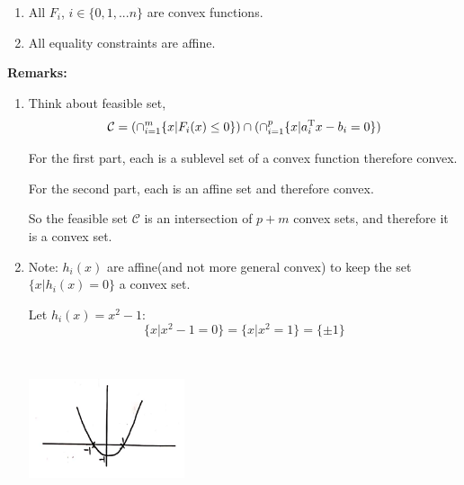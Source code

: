 \begin{enumerate}
	\item All $F_i$, $i\in \{0,1,...n \}$ are convex functions.
	\item All equality constraints are affine.
\end{enumerate}


%	

\textbf{Remarks:}
\begin{enumerate}
	\item Think about feasible set,
	\begin{equation*}
	\mathcal{C} = ( \cap^m_{i=1}\{x\vert F_i(x) \leq 0 \} ) \cap (\cap^p_{i=1}\{x\vert a_i^{{\rm T}}x - b_i = 0 \})
	\end{equation*}
	
	For the first part, each is a sublevel set of a convex function therefore convex.
	
	For the second part, each is an affine set and therefore convex.
	
    So the feasible set $\mathcal{C}$ is an intersection of $p+m$ convex sets, and therefore it is a convex set.
	
	\item Note: $h_i(x)$ are affine(and not more general convex) to keep the set $\{x\vert h_i(x) = 0 \}$ a convex set. 
	
	Let $h_i(x) = x^2 - 1$: 
	\begin{equation*}
	\{x\vert x^2 - 1 = 0 \} = \{x\vert x^2 = 1 \} = \{\pm 1 \}
	\end{equation*}
	\begin{marginfigure}
	\centering
	\includegraphics[width=1.8in,height=1.8in]{figures/ch08/figure1111_6.png}
	\end{marginfigure}
\end{enumerate}

